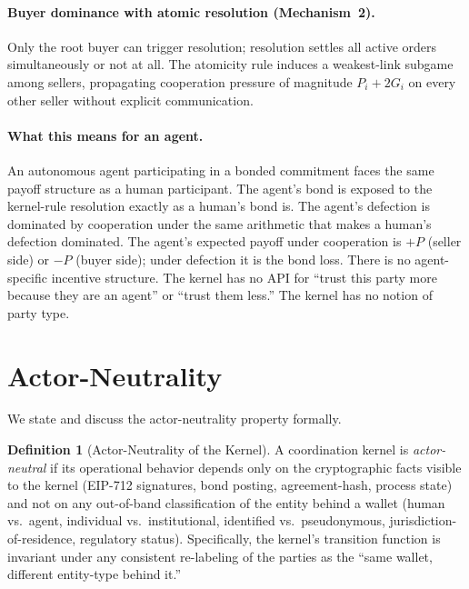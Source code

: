 \documentclass[11pt,a4paper]{article}
\theoremstyle{definition}
\newtheorem{definition}[theorem]{Definition}
\theoremstyle{remark}
\newcommand{\pay}{P}
\newcommand{\cumval}{G}
\begin{document}
\paragraph{Buyer dominance with atomic resolution (Mechanism~2).}
Only the root buyer can trigger resolution; resolution settles
all active orders simultaneously or not at all. The atomicity rule
induces a weakest-link subgame among sellers, propagating
cooperation pressure of magnitude $\pay_i + 2\cumval_i$ on every
other seller without explicit communication.

\paragraph{What this means for an agent.}
An autonomous agent participating in a bonded commitment faces
the same payoff structure as a human participant. The agent's
bond is exposed to the kernel-rule resolution exactly as a human's
bond is. The agent's defection is dominated by cooperation under
the same arithmetic that makes a human's defection dominated. The
agent's expected payoff under cooperation is $+\pay$ (seller side)
or $-\pay$ (buyer side); under defection it is the bond loss.
There is no agent-specific incentive structure. The kernel has
no API for ``trust this party more because they are an agent''
or ``trust them less.'' The kernel has no notion of party type.

\section{Actor-Neutrality}
\label{sec:actor-neutrality}

We state and discuss the actor-neutrality property formally.

\begin{definition}[Actor-Neutrality of the Kernel]
\label{def:actor-neutrality}
A coordination kernel is \emph{actor-neutral} if its operational
behavior depends only on the cryptographic facts visible to the
kernel (EIP-712 signatures, bond posting, agreement-hash, process
state) and not on any out-of-band classification of the entity
behind a wallet (human vs.\ agent, individual vs.\ institutional,
identified vs.\ pseudonymous, jurisdiction-of-residence, regulatory
status). Specifically, the kernel's transition function is invariant
under any consistent re-labeling of the parties as the
``same wallet, different entity-type behind it.''
\end{definition}
\end{document}
